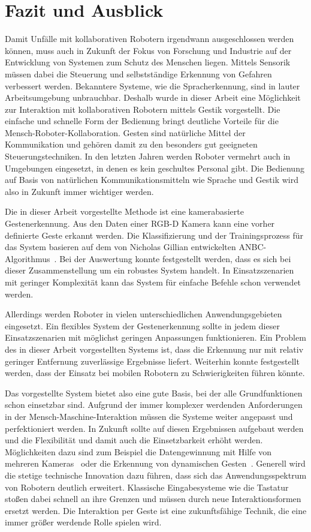 \chapter{Fazit und Ausblick}
Damit Unfälle mit kollaborativen Robotern irgendwann ausgeschlossen werden können, muss auch in Zukunft der Fokus von Forschung und Industrie auf der Entwicklung von Systemen zum Schutz des Menschen liegen. Mittels Sensorik müssen dabei die Steuerung und selbstständige Erkennung von Gefahren verbessert werden. Bekanntere Systeme, wie die Spracherkennung, sind in lauter Arbeitsumgebung unbrauchbar. Deshalb wurde in dieser Arbeit eine Möglichkeit zur Interaktion mit kollaborativen Robotern mittels Gestik vorgestellt. Die einfache und schnelle Form der Bedienung bringt deutliche Vorteile für die Mensch-Roboter-Kollaboration. Gesten sind natürliche Mittel der Kommunikation und gehören damit zu den besonders gut geeigneten Steuerungstechniken. In den letzten Jahren werden Roboter vermehrt auch in Umgebungen eingesetzt, in denen es kein geschultes Personal gibt. Die Bedienung auf Basis von natürlichen Kommunikationsmitteln wie Sprache und Gestik wird also in Zukunft immer wichtiger werden. 

Die in dieser Arbeit vorgestellte Methode ist eine kamerabasierte Gestenerkennung. Aus den Daten einer RGB-D Kamera kann eine vorher definierte Geste erkannt werden. Die Klassifizierung und der Trainingsprozess für das System basieren auf dem von Nicholas Gillian entwickelten ANBC-Algorithmus~\cite{gillianANBC}. Bei der Auswertung konnte festgestellt werden, dass es sich bei dieser Zusammenstellung um ein robustes System handelt. In Einsatzszenarien mit geringer Komplexität kann das System für einfache Befehle schon verwendet werden.

Allerdings werden Roboter in vielen unterschiedlichen Anwendungsgebieten eingesetzt. Ein flexibles System der Gestenerkennung sollte in jedem dieser Einsatzszenarien mit möglichst geringen Anpassungen funktionieren. Ein Problem des in dieser Arbeit vorgestellten Systems ist, dass die Erkennung nur mit relativ geringer Entfernung zuverlässige Ergebnisse liefert. Weiterhin konnte festgestellt werden, dass der Einsatz bei mobilen Robotern zu Schwierigkeiten führen könnte.

Das vorgestellte System bietet also eine gute Basis, bei der alle Grundfunktionen schon einsetzbar sind. Aufgrund der immer komplexer werdenden Anforderungen in der Mensch-Maschine-Interaktion müssen die Systeme weiter angepasst und perfektioniert werden. In Zukunft sollte auf diesen Ergebnissen aufgebaut werden und die Flexibilität und damit auch die Einsetzbarkeit erhöht werden. Möglichkeiten dazu sind zum Beispiel die Datengewinnung mit Hilfe von mehreren Kameras~\cite{multipleDepthCameras} oder die Erkennung von dynamischen Gesten~\cite{hiddenMarkov}. Generell wird die stetige technische Innovation dazu führen, dass sich das Anwendungsspektrum von Robotern deutlich erweitert. Klassische Eingabesysteme wie die Tastatur stoßen dabei schnell an ihre Grenzen und müssen durch neue Interaktionsformen ersetzt werden. Die Interaktion per Geste ist eine zukunftsfähige Technik, die eine immer größer werdende Rolle spielen wird.  

 